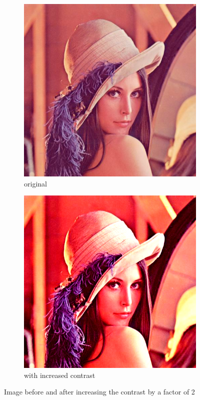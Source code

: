 \documentclass[12pt]{article}
\newcommand{\subfiguresize}{.3\textwidth}
\begin{document}
\begin{figure}[H]\centering
    \begin{subfigure}[t]{\subfiguresize}\centering
        \includegraphics[width=\textwidth]{lenac.png}
        \caption{original}
    \end{subfigure}
    \hspace{.05\textwidth}
    \begin{subfigure}[t]{\subfiguresize}\centering
        \includegraphics[width=\textwidth]{lenac_contrast_2x.png}
        \caption{with increased contrast}
    \end{subfigure}
    \caption{Image before and after increasing the contrast by a factor of 2}
\end{figure}
\end{document}
